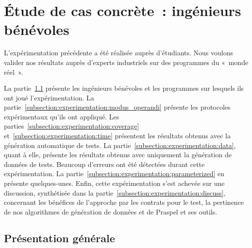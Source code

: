 \section{Étude de cas concrète~: ingénieurs bénévoles}
\label{section:experimentation:real}

L'expérimentation précédente a été réalisée auprès d'étudiants. Nous voulons
valider nos résultats auprès d'experts industriels sur des programmes du «~monde
réel~».

La partie~\ref{subsection:experimentation:presentation} présente les ingénieurs
bénévoles et les programmes sur lesquels ils ont joué l'expérimentation. La
partie~\ref{subsection:experimentation:modus_operandi} présente les protocoles
expérimentaux qu'ils ont appliqué. Les
parties~\ref{subsection:experimentation:coverage}
et~\ref{subsection:experimentation:time} présentent les résultats obtenus avec
la génération automatique de tests. La
partie~\ref{subsection:experimentation:data}, quant à elle, présente les
résultats obtenus avec uniquement la génération de données de tests. Beaucoup
d'erreurs ont été détectées durant cette expérimentation. La
partie~\ref{subsection:experimentation:parameterized} en présente quelques-unes.
Enfin, cette expérimentation s'est achevée sur une discussion, synthétisée dans
la partie~\ref{subsection:experimentation:discuss}, concernant les bénéfices de
l'approche par les contrats pour le test, la pertinence de nos algorithmes de
génération de données et de Praspel et ses outils.

\subsection{Présentation générale}
\label{subsection:experimentation:presentation}

